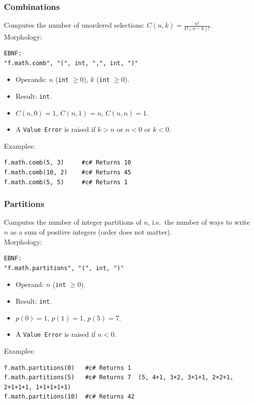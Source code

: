 \subsubsection{Combinations}
Computes the number of unordered selections: $C(n, k) = \frac{n!}{k!(n-k)!}$. \\
Morphology:
\begin{verbatim}
EBNF:
"f.math.comb", "(", int, ",", int, ")"
\end{verbatim}
\begin{itemize}
\item Operands: $n$ (\texttt{int} $\geq 0$), $k$ (\texttt{int} $\geq 0$).
\item Result: \texttt{int}.
\item $C(n, 0) = 1$, $C(n, 1) = n$, $C(n, n) = 1$.
\item A \texttt{Value Error} is raised if $k > n$ or $n < 0$ or $k < 0$.
\end{itemize}
Examples:
\begin{verbatim}
f.math.comb(5, 3)     #c# Returns 10
f.math.comb(10, 2)    #c# Returns 45
f.math.comb(5, 5)     #c# Returns 1
\end{verbatim}

\subsubsection{Partitions}
Computes the number of integer partitions of $n$, i.e.\ the number of ways to write $n$ as a sum of positive integers (order does not matter). \\
Morphology:
\begin{verbatim}
EBNF:
"f.math.partitions", "(", int, ")"
\end{verbatim}
\begin{itemize}
\item Operand: $n$ (\texttt{int} $\geq 0$).
\item Result: \texttt{int}.
\item $p(0) = 1$, $p(1) = 1$, $p(5) = 7$.
\item A \texttt{Value Error} is raised if $n < 0$.
\end{itemize}
Examples:
\begin{verbatim}
f.math.partitions(0)   #c# Returns 1
f.math.partitions(5)   #c# Returns 7  (5, 4+1, 3+2, 3+1+1, 2+2+1, 2+1+1+1, 1+1+1+1+1)
f.math.partitions(10)  #c# Returns 42
\end{verbatim}

